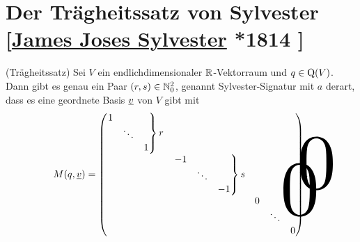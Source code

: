 \documentclass[../../main.tex]{subfiles}
\begin{document}
\section[Der Trägheitssatz von Sylvester]{Der Trägheitssatz von Sylvester\\{\small[\href{https://de.wikipedia.org/wiki/James_Joseph_Sylvester}{James Joses Sylvester} *1814 ]}}

\begin{satdef}\label{14.1.1}
    (Trägheitssatz) Sei $V$ ein endlichdimensionaler $\mathbb R$-Vektorraum und $q\in \operatorname{Q}(V)$. Dann gibt es genau ein Paar $(r,s)\in \mathbb N_0^2$, genannt Sylvester-Signatur mit $a$ derart, dass es eine geordnete Basis ${\underline v}$ von $V$ gibt mit
    \begin{align*}
        M(q,\underline{v})=
        \begin{pmatrix*}
            \begin{rcases}
                \begin{matrix}
                    1 & & \\& \ddots & \\& & 1
                \end{matrix}
            \end{rcases} r &  & \tikz[remember picture]\node[inner sep=0pt] (a) { };\\
             & \begin{rcases}
                \begin{matrix}
                    -1 & & \\& \ddots & \\& & -1
                \end{matrix}
            \end{rcases} s & \\
            \tikz[remember picture]\node[inner sep=0pt] (b) { }; &  & 
            \begin{matrix}
                0 & & \\& \ddots & \\& & 0
            \end{matrix}
        \end{pmatrix*}.
        \begin{tikzpicture}[overlay, remember picture]
            \node at (a.north) [anchor=center,yshift=-0.5cm, xshift=-0.3cm, scale=8] {$0$};
            \node at (b.south) [anchor=center,yshift=0.5cm, xshift=0.3cm, scale=8] {$0$};
        \end{tikzpicture}
    \end{align*}
\end{satdef}
\end{document}
